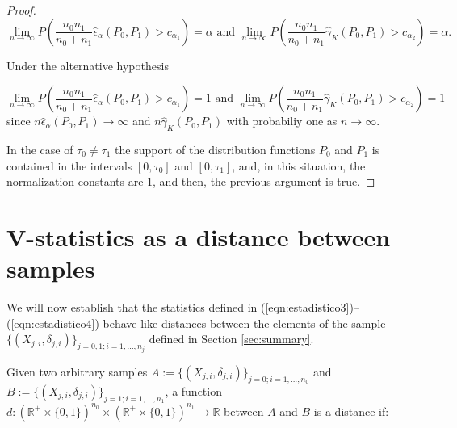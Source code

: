 \documentclass[11pt]{article}
\begin{document}
\begin{appendices}
\begin{proof}
	
	\begin{equation*}
	\lim_{n\to \infty} P(\frac{n_0 n_1}{n_{0}+n_{1}} \hat{\epsilon}_{\alpha}(P_0,P_1) > c_{\alpha_1})= \alpha  \text{ and } \lim_{n\to \infty} P(\frac{n_0n_1}{n_{0}+n_1} \hat{\gamma}_K(P_0,P_1) > c_{\alpha_2})=\alpha.
	\end{equation*} 
	
	Under the alternative hypothesis
	
	\begin{equation*}
	\lim_{n\to \infty} P(\frac{n_0 n_1}{n_{0}+n_{1}} \hat{\epsilon}_{\alpha}(P_0,P_1) > c_{\alpha_1})=1  \text{ and } \lim_{n\to \infty} P(\frac{n_0n_1}{n_{0}+n_1} \hat{\gamma}_K(P_0,P_1) > c_{\alpha_2})=1
	\end{equation*} 
	since $n\hat{\epsilon}_{\alpha}(P_0,P_1) \to \infty$ and $ n\hat{\gamma}_K(P_0,P_1)$ with probabiliy one as $n\to \infty$.
	
	
	
	
	
	
	
	In the case of $\tau_0 \neq \tau_1$ the  support of the distribution functions $P_0$ and $P_1$ is  contained in the intervals $ [0,\tau_0] $ and $[0,\tau_1]$, and, in this situation, the normalization constants are $1$, and then, the previous argument is  true.
\end{proof}    



\section{V-statistics as a distance between samples}
\label{appendix:B}
We will now establish that the statistics defined in (\ref{eqn:estadistico3})--(\ref{eqn:estadistico4})  behave like distances between the elements of the sample $\{(X_{j,i},\delta_{j,i})\}_{j=0,1; i=1,\dots,n_j}$ defined in Section \ref{sec:summary}. 	





Given two arbitrary samples  $A:=\{(X_{j,i},\delta_{j,i})\}_{j=0; i=1,\dots,n_0}$ and $B:=\{(X_{j,i},\delta_{j,i})\}_{j=1; i=1,\dots,n_1}$, a function $d: (\mathbb{R}^{+}\times \{0,1\})^{n_0}\times (\mathbb{R}^{+}\times \{0,1\})^{n_1} \to \mathbb{R}$ between  $A$ and $B$ is a distance if:



\end{appendices}
\end{document}
